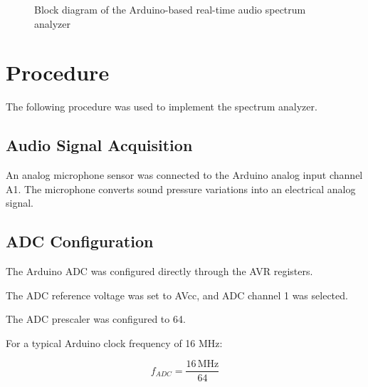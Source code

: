 \documentclass{article}
\begin{document}
\begin{center}
\begin{figure}[H]

\caption{Block diagram of the Arduino-based real-time audio spectrum analyzer}
\label{fig:blockdiagram}

\end{figure}

\newpage


\section{Procedure}

The following procedure was used to implement the spectrum analyzer.

\subsection{Audio Signal Acquisition}

An analog microphone sensor was connected to the Arduino analog input channel A1. The microphone converts sound pressure variations into an electrical analog signal.

\subsection{ADC Configuration}

The Arduino ADC was configured directly through the AVR registers.

The ADC reference voltage was set to AVcc, and ADC channel 1 was selected.

The ADC prescaler was configured to 64.

For a typical Arduino clock frequency of 16 MHz:

\[
f_{ADC} =
\frac{16\,\text{MHz}}{64}
\]


\end{center}
\end{document}
